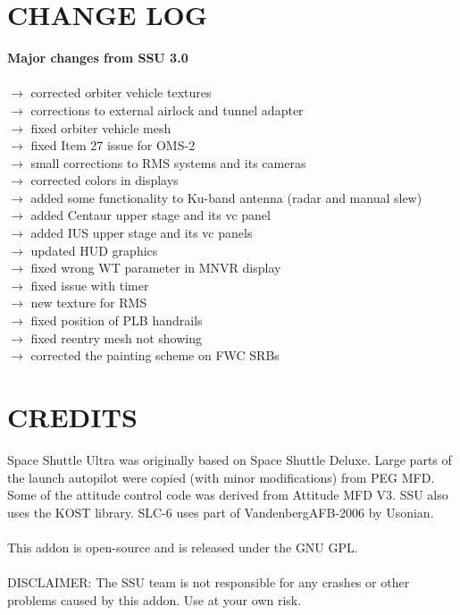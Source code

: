 \documentclass[13pt]{article}
\begin{document}
\section{CHANGE LOG}
\noindent
\textbf{Major changes from SSU 3.0}\\\\
$\rightarrow$ corrected orbiter vehicle textures\\
$\rightarrow$ corrections to external airlock and tunnel adapter\\
$\rightarrow$ fixed orbiter vehicle mesh\\
$\rightarrow$ fixed Item 27 issue for OMS-2\\
$\rightarrow$ small corrections to RMS systems and its cameras\\
$\rightarrow$ corrected colors in displays\\
$\rightarrow$ added some functionality to Ku-band antenna (radar and manual slew)\\
$\rightarrow$ added Centaur upper stage and its vc panel\\
$\rightarrow$ added IUS upper stage and its vc panels\\
$\rightarrow$ updated HUD graphics\\
$\rightarrow$ fixed wrong WT parameter in MNVR display\\
$\rightarrow$ fixed issue with timer\\
$\rightarrow$ new texture for RMS\\
$\rightarrow$ fixed position of PLB handrails\\
$\rightarrow$ fixed reentry mesh not showing\\
$\rightarrow$ corrected the painting scheme on FWC SRBs\\


\newpage
\section{CREDITS}
Space Shuttle Ultra was originally based on Space Shuttle Deluxe. Large parts of the launch autopilot were copied (with minor modifications) from PEG MFD.
Some of the attitude control code was derived from Attitude MFD V3.
SSU also uses the KOST library.
SLC-6 uses part of VandenbergAFB-2006 by Usonian.\\
\\
This addon is open-source and is released under the GNU GPL. \\
\\
DISCLAIMER: The SSU team is not responsible for any crashes or other problems caused by this addon. Use at your own risk.
\end{document}
